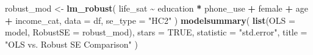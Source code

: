 \documentclass[
  11pt,
]{article}
\newenvironment{Shaded}{\begin{snugshade}}{\end{snugshade}}
\newcommand{\AttributeTok}[1]{\textcolor[rgb]{0.13,0.29,0.53}{#1}}
\newcommand{\ConstantTok}[1]{\textcolor[rgb]{0.56,0.35,0.01}{#1}}
\newcommand{\FunctionTok}[1]{\textcolor[rgb]{0.13,0.29,0.53}{\textbf{#1}}}
\newcommand{\NormalTok}[1]{#1}
\newcommand{\OtherTok}[1]{\textcolor[rgb]{0.56,0.35,0.01}{#1}}
\newcommand{\SpecialCharTok}[1]{\textcolor[rgb]{0.81,0.36,0.00}{\textbf{#1}}}
\newcommand{\StringTok}[1]{\textcolor[rgb]{0.31,0.60,0.02}{#1}}
\begin{document}
\begin{Shaded}
\begin{Highlighting}[]
\NormalTok{robust\_mod }\OtherTok{\textless{}{-}} \FunctionTok{lm\_robust}\NormalTok{(}
\NormalTok{  life\_sat }\SpecialCharTok{\textasciitilde{}}\NormalTok{ education }\SpecialCharTok{*}\NormalTok{ phone\_use }\SpecialCharTok{+}\NormalTok{ female }\SpecialCharTok{+}\NormalTok{ age }\SpecialCharTok{+}\NormalTok{ income\_cat,}
  \AttributeTok{data =}\NormalTok{ df, }\AttributeTok{se\_type =} \StringTok{"HC2"}
\NormalTok{)}
\FunctionTok{modelsummary}\NormalTok{(}
  \FunctionTok{list}\NormalTok{(}\AttributeTok{OLS =}\NormalTok{ model, }\AttributeTok{RobustSE =}\NormalTok{ robust\_mod),}
  \AttributeTok{stars =} \ConstantTok{TRUE}\NormalTok{, }\AttributeTok{statistic =} \StringTok{"std.error"}\NormalTok{,}
  \AttributeTok{title =} \StringTok{"OLS vs. Robust SE Comparison"}
\NormalTok{)}
\end{Highlighting}
\end{Shaded}
\end{document}
